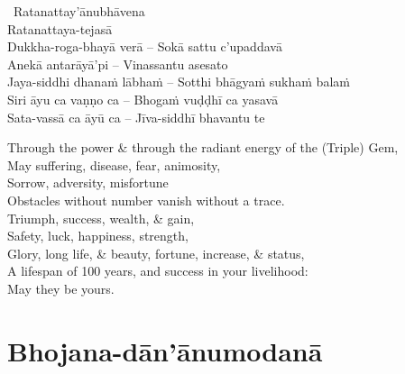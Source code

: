 \begin{pali-hangtogether}
  \anglebracketleft\ \hspace{-0.5mm}Ratanattay'ānubhāvena \hspace{-0.5mm}\anglebracketright\ \\
  Ratanattaya-tejasā\\
  Dukkha-roga-bhayā verā – Sokā sattu c'upaddavā\\
  Anekā antarāyā'pi – Vinassantu asesato\\
  Jaya-siddhi dhanaṁ lābhaṁ – Sotthi bhāgyaṁ sukhaṁ balaṁ\\
  Siri āyu ca vaṇṇo ca – Bhogaṁ vuḍḍhī ca yasavā\\
  Sata-vassā ca āyū ca – Jīva-siddhī bhavantu te
\end{pali-hangtogether}

\begin{english-verses}
  Through the power \& through the radiant energy of the (Triple) Gem,\\
  May suffering, disease, fear, animosity,\\
  Sorrow, adversity, misfortune\\
  Obstacles without number vanish without a trace.\\
  Triumph, success, wealth, \& gain,\\
  Safety, luck, happiness, strength,\\
  Glory, long life, \& beauty, fortune, increase, \& status,\\
  A lifespan of 100 years, and success in your livelihood:\\
  May they be yours.
\end{english-verses}

\suttaRef{[Thai]}

\section{Bhojana-dān'ānumodanā}
\label{bhojana-dananumodana}



